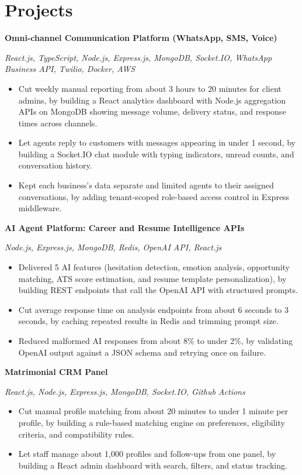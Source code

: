 \documentclass[a4paper,10pt]{article}
\newcommand{\project}[2]{\vspace{2pt}\textbf{#1}\par\textit{#2}\par\vspace{1pt}}
\begin{document}
\section{Projects}
\project{Omni-channel Communication Platform (WhatsApp, SMS, Voice)}{React.js, TypeScript, Node.js, Express.js, MongoDB, Socket.IO, WhatsApp Business API, Twilio, Docker, AWS}
\begin{itemize}
  \item Cut weekly manual reporting from about 3 hours to 20 minutes for client admins, by building a React analytics dashboard with Node.js aggregation APIs on MongoDB showing message volume, delivery status, and response times across channels.
  \item Let agents reply to customers with messages appearing in under 1 second, by building a Socket.IO chat module with typing indicators, unread counts, and conversation history.
  \item Kept each business's data separate and limited agents to their assigned conversations, by adding tenant-scoped role-based access control in Express middleware.
\end{itemize}

\project{AI Agent Platform: Career and Resume Intelligence APIs}{Node.js, Express.js, MongoDB, Redis, OpenAI API, React.js}
\begin{itemize}
  \item Delivered 5 AI features (hesitation detection, emotion analysis, opportunity matching, ATS score estimation, and resume template personalization), by building REST endpoints that call the OpenAI API with structured prompts.
  \item Cut average response time on analysis endpoints from about 6 seconds to 3 seconds, by caching repeated results in Redis and trimming prompt size.
  \item Reduced malformed AI responses from about 8\% to under 2\%, by validating OpenAI output against a JSON schema and retrying once on failure.
\end{itemize}

\project{Matrimonial CRM Panel}{React.js, Node.js, Express.js, MongoDB, Socket.IO, Github Actions}
\begin{itemize}
  \item Cut manual profile matching from about 20 minutes to under 1 minute per profile, by building a rule-based matching engine on preferences, eligibility criteria, and compatibility rules.
  \item Let staff manage about 1,000 profiles and follow-ups from one panel, by building a React admin dashboard with search, filters, and status tracking.
\end{itemize}
\end{document}
